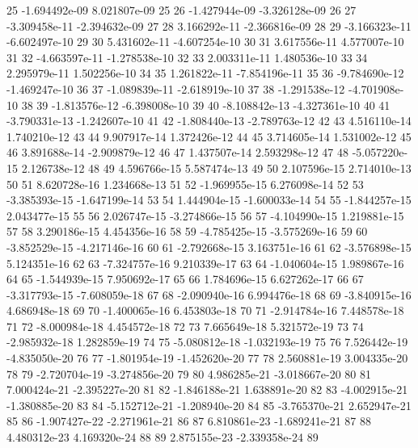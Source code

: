 \documentclass{article}
\begin{document}
\begin{Schunk}
\begin{Soutput}
25    -1.694492e-09   8.021807e-09   25
26    -1.427944e-09  -3.326128e-09   26
27    -3.309458e-11  -2.394632e-09   27
28     3.166292e-11  -2.366816e-09   28
29    -3.166323e-11  -6.602497e-10   29
30     5.431602e-11  -4.607254e-10   30
31     3.617556e-11   4.577007e-10   31
32    -4.663597e-11  -1.278538e-10   32
33     2.003311e-11   1.480536e-10   33
34     2.295979e-11   1.502256e-10   34
35     1.261822e-11  -7.854196e-11   35
36    -9.784690e-12  -1.469247e-10   36
37    -1.089839e-11  -2.618919e-10   37
38    -1.291538e-12  -4.701908e-10   38
39    -1.813576e-12  -6.398008e-10   39
40    -8.108842e-13  -4.327361e-10   40
41    -3.790331e-13  -1.242607e-10   41
42    -1.808440e-13  -2.789763e-12   42
43     4.516110e-14   1.740210e-12   43
44     9.907917e-14   1.372426e-12   44
45     3.714605e-14   1.531002e-12   45
46     3.891688e-14  -2.909879e-12   46
47     1.437507e-14   2.593298e-12   47
48    -5.057220e-15   2.126738e-12   48
49     4.596766e-15   5.587474e-13   49
50     2.107596e-15   2.714010e-13   50
51     8.620728e-16   1.234668e-13   51
52    -1.969955e-15   6.276098e-14   52
53    -3.385393e-15  -1.647199e-14   53
54     1.444904e-15  -1.600033e-14   54
55    -1.844257e-15   2.043477e-15   55
56     2.026747e-15  -3.274866e-15   56
57    -4.104990e-15   1.219881e-15   57
58     3.290186e-15   4.454356e-16   58
59    -4.785425e-15  -3.575269e-16   59
60    -3.852529e-15  -4.217146e-16   60
61    -2.792668e-15   3.163751e-16   61
62    -3.576898e-15   5.124351e-16   62
63    -7.324757e-16   9.210339e-17   63
64    -1.040604e-15   1.989867e-16   64
65    -1.544939e-15   7.950692e-17   65
66     1.784696e-15   6.627262e-17   66
67    -3.317793e-15  -7.608059e-18   67
68    -2.090940e-16   6.994476e-18   68
69    -3.840915e-16   4.686948e-18   69
70    -1.400065e-16   6.453803e-18   70
71    -2.914784e-16   7.448578e-18   71
72    -8.000984e-18   4.454572e-18   72
73     7.665649e-18   5.321572e-19   73
74    -2.985932e-18   1.282859e-19   74
75    -5.080812e-18  -1.032193e-19   75
76     7.526442e-19  -4.835050e-20   76
77    -1.801954e-19  -1.452620e-20   77
78     2.560881e-19   3.004335e-20   78
79    -2.720704e-19  -3.274856e-20   79
80     4.986285e-21  -3.018667e-20   80
81     7.000424e-21  -2.395227e-20   81
82    -1.846188e-21   1.638891e-20   82
83    -4.002915e-21  -1.380885e-20   83
84    -5.152712e-21  -1.208940e-20   84
85    -3.765370e-21   2.652947e-21   85
86    -1.907427e-22  -2.271961e-21   86
87     6.810861e-23  -1.689241e-21   87
88     4.480312e-23   4.169320e-24   88
89     2.875155e-23  -2.339358e-24   89

\end{Soutput}
\end{Schunk}
\end{document}
